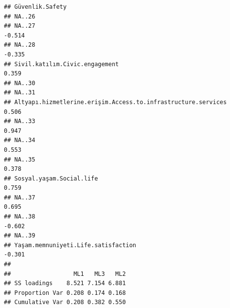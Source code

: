 \documentclass[
]{article}
\begin{document}
\begin{verbatim}
## Güvenlik.Safety                                                     
## NA..26                                                              
## NA..27                                                        -0.514
## NA..28                                                        -0.335
## Sivil.katılım.Civic.engagement                                 0.359
## NA..30                                                              
## NA..31                                                              
## Altyapı.hizmetlerine.erişim.Access.to.infrastructure.services  0.506
## NA..33                                                         0.947
## NA..34                                                         0.553
## NA..35                                                         0.378
## Sosyal.yaşam.Social.life                                       0.759
## NA..37                                                         0.695
## NA..38                                                        -0.602
## NA..39                                                              
## Yaşam.memnuniyeti.Life.satisfaction                           -0.301
## 
##                  ML1   ML3   ML2
## SS loadings    8.521 7.154 6.881
## Proportion Var 0.208 0.174 0.168
## Cumulative Var 0.208 0.382 0.550
\end{verbatim}
\end{document}
